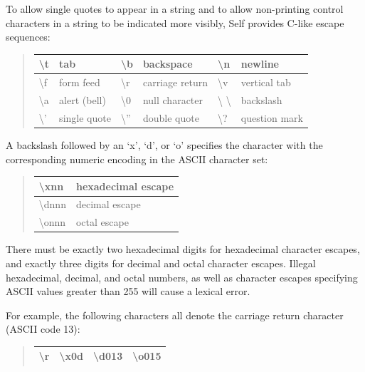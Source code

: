 \documentclass[letterpaper,10pt,english]{sphinxmanual}
\begin{document}
To allow single quotes to appear in a string and to allow non-printing control characters in a string
to be indicated more visibly, Self provides C-like escape sequences:
\begin{quote}

\begin{tabulary}{\linewidth}{|L|L|L|L|L|L|}
\hline

\textbackslash{}t
 & 
tab
 & 
\textbackslash{}b
 & 
backspace
 & 
\textbackslash{}n
 & 
newline
\\\hline

\textbackslash{}f
 & 
form feed
 & 
\textbackslash{}r
 & 
carriage return
 & 
\textbackslash{}v
 & 
vertical tab
\\\hline

\textbackslash{}a
 & 
alert (bell)
 & 
\textbackslash{}0
 & 
null character
 & 
\textbackslash{} \textbackslash{}
 & 
backslash
\\\hline

\textbackslash{}’
 & 
single quote
 & 
\textbackslash{}''
 & 
double quote
 & 
\textbackslash{}?
 & 
question mark
\\\hline
\end{tabulary}

\end{quote}

A backslash followed by an ‘x’, ‘d’, or ‘o’ specifies the character with the corresponding numeric
encoding in the ASCII character set:
\begin{quote}

\begin{tabulary}{\linewidth}{|L|L|}
\hline

\textbackslash{}xnn
 & 
hexadecimal escape
\\\hline

\textbackslash{}dnnn
 & 
decimal escape
\\\hline

\textbackslash{}onnn
 & 
octal escape
\\\hline
\end{tabulary}

\end{quote}

There must be exactly two hexadecimal digits for hexadecimal character escapes, and exactly three
digits for decimal and octal character escapes. Illegal hexadecimal, decimal, and octal numbers, as
well as character escapes specifying ASCII values greater than 255 will cause a lexical error.

For example, the following characters all denote the carriage return character (ASCII code 13):
\begin{quote}

\begin{tabulary}{\linewidth}{|L|L|L|L|}
\hline

\textbackslash{}r
 & 
\textbackslash{}x0d
 & 
\textbackslash{}d013
 & 
\textbackslash{}o015
\\\hline
\end{tabulary}

\end{quote}
\end{document}
